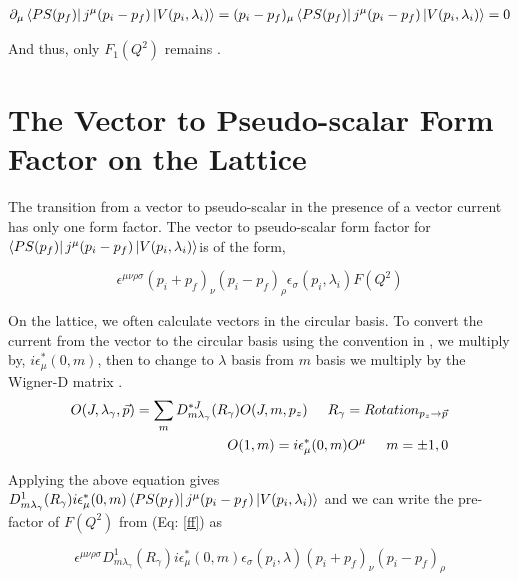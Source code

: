 \documentclass[10pt]{article}
\begin{document}
\begin{align*}
\partial_{\mu}\bra{PS(p_f)} j^{\mu}(p_i - p_f)\ket{V(p_i, \lambda_i)} = (p_i - p_f)_{\mu}\bra{PS(p_f)} j^{\mu}(p_i - p_f)\ket{V(p_i, \lambda_i)} = 0
\end{align*}

And thus, only $F_1(Q^2)$ remains \cite{shultz}.





\section{The Vector to Pseudo-scalar Form Factor on the Lattice } 
The transition from a vector to pseudo-scalar in the presence of a vector current has only one form factor.
The vector to pseudo-scalar form factor for $\bra{PS(p_f)} j^{\mu}(p_i - p_f)\ket{V(p_i, \lambda_i)}$is of the form,

\begin{equation}
\label{ff}
\epsilon^{\mu\nu\rho\sigma}(p_i + p_f)_{\nu}(p_i - p_f)_{\rho}\epsilon_{\sigma}(p_i, \lambda_i)F(Q^{2})
\end{equation}

\par
On the lattice, we often calculate vectors in the circular basis. To convert the current from the vector to the circular basis using the convention in \cite{hel}, we multiply by,  $i \epsilon^{*}_{\mu}(0,m)$, then to change to $\lambda$ basis from $m$ basis we multiply by the Wigner-D matrix \cite{hel}.
\begin{align*}
O(J, \lambda_{\gamma}, \vec{p}) = \sum_{m} D^{*J}_{m\lambda_{\gamma}}(R_{\gamma}) O(J, m, p_z) \hspace{5mm} R_{\gamma} = Rotation_{p_z \rightarrow \vec{p}}  \\
O(1,m) = i \epsilon^{*}_{\mu}(0,m)O^{\mu} \hspace{5mm} m = \pm 1, 0
\end{align*}

Applying the above equation gives $ D^{1}_{m\lambda_{\gamma}}(R_{\gamma})i \epsilon^{*}_{\mu} (0, m)\bra{PS(p_f)} j^{\mu}(p_i - p_f)\ket{V(p_i, \lambda_i)}$ and we can write the pre-factor of  $F(Q^2)$ from (Eq: \ref{ff}) as

\begin{equation}
\label{amp}
\epsilon^{\mu\nu\rho\sigma}  D^{1}_{m\lambda_{\gamma}}(R_{\gamma}) i \epsilon^{*}_{\mu}(0, m)\epsilon_{\sigma}(p_i, \lambda)(p_i + p_f)_{\nu}(p_i - p_f)_{\rho}
\end{equation}
\end{document}

